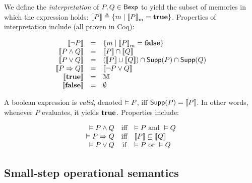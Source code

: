 \documentclass[10pt]{article}
\theoremstyle{definition}
\begin{document}

%
We define the \emph{interpretation} of $P,Q \in \mathsf{Bexp}$
to yield the subset of memories
in which the expression holds:
$\Interp P \triangleq \SetBuild(m | {\Eval(P,m) = \True})$.
Properties of interpretation include (all proven in Coq):

\begin{displaymath}
\begin{array}{rcl}
\Interp{\neg P} & = & \SetBuild(m | {\Eval(P,m) = \False}) \\
\Interp{P \wedge Q} & = & \Interp{P} \cap \Interp{Q} \\
\Interp{P \vee Q} & = & (\Interp{P} \cup \Interp{Q}) \cap \Support P \cap \Support Q \\
\Interp{P \Rightarrow Q} & = & \Interp{\neg P \vee Q} \\
\Interp{\ETrue} & = & \Mems  \\
\Interp{\EFalse} & = & \emptyset \\
\end{array}
\end{displaymath}

A boolean expression is \emph{valid},
denoted $\vDash P$,
iff $\mathsf{Supp}(P) = \left\llbracket P \right\rrbracket$.
In other words, whenever $P$ evaluates,
it yields $\textbf{true}$.
Properties include:
{

\newcommand*{\LINE}[3]{%
    \VAL #1 & \text{#3} & #2 \\
}


\begin{displaymath}
\begin{array}{rcl}
\LINE {P \wedge Q}{\VAL P \text{ and } \VAL Q}{iff}
\LINE {P \Rightarrow Q}{\Interp P \subseteq \Interp Q}{iff}
\LINE {P \vee Q}{\VAL P \text{ or } \VAL Q}{if}
\end{array}
\end{displaymath}

}


\subsection*{Small-step operational semantics}
\end{document}
